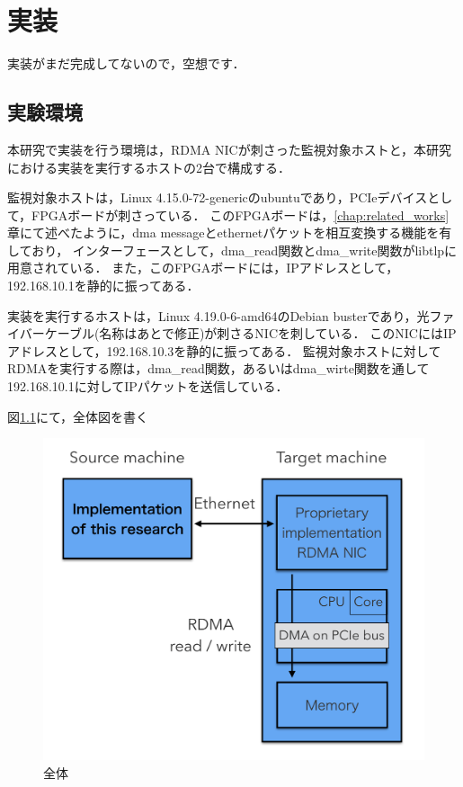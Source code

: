 \chapter{実装}
\label{chap:implementation}

実装がまだ完成してないので，空想です．

\section{実験環境}

本研究で実装を行う環境は，RDMA NICが刺さった監視対象ホストと，本研究における実装を実行するホストの2台で構成する．

監視対象ホストは，Linux 4.15.0-72-genericのubuntuであり，PCIeデバイスとして，FPGAボードが刺さっている．
このFPGAボードは，\ref{chap:related_works}章にて述べたように，dma messageとethernetパケットを相互変換する機能を有しており，
インターフェースとして，dma_read関数とdma_write関数がlibtlpに用意されている．
また，このFPGAボードには，IPアドレスとして，192.168.10.1を静的に振ってある．

実装を実行するホストは，Linux 4.19.0-6-amd64のDebian busterであり，光ファイバーケーブル(名称はあとで修正)が刺さるNICを刺している．
このNICにはIPアドレスとして，192.168.10.3を静的に振ってある．
監視対象ホストに対してRDMAを実行する際は，dma_read関数，あるいはdma_wirte関数を通して192.168.10.1に対してIPパケットを送信している．

図\ref{fig:zentai}にて，全体図を書く


\begin{figure}[htbp]
    \caption{全体}
    \label{fig:zentai}
    \begin{center}
        \includegraphics[bb=0 0 1000 530,width=15cm]{img/zentai.png}
    \end{center}
\end{figure}

